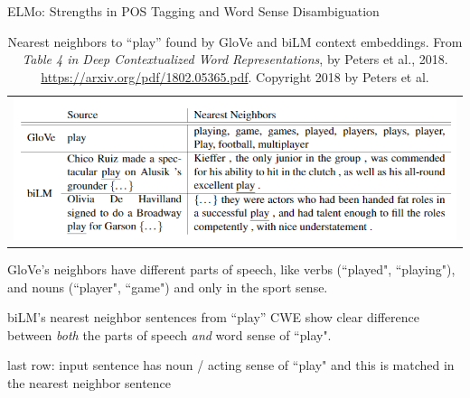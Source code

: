 \begin{frame}{ELMo: Strengths in POS Tagging and Word Sense Disambiguation}
    
    \vspace{10pt}
    
    \begin{table}[ht!]
      \centering
      \begin{tabular}{ c }
        
        \begin{minipage}{.9\textwidth}
          \includegraphics[width=\linewidth]{imgs/table_elmoPlay.png}
        \end{minipage}
        \vspace{-7pt}
      \end{tabular}
      \caption{\linespread{0.3} \scriptsize Nearest neighbors to ``play” found by GloVe and biLM context embeddings. From \emph{Table 4 in Deep Contextualized Word Representations}, by Peters et al., 2018. \url{https://arxiv.org/pdf/1802.05365.pdf}. Copyright 2018 by Peters et al.}
      \label{tbl:elmoPlayExample}
      \vspace{-10pt}
    \end{table}
    
    
    \vspace{-10pt}
    \begin{itemizeSpaced}{7pt}
    
        \pinkbox GloVe's neighbors have different parts of speech, like verbs (``played", ``playing"), and nouns (``player", ``game") and only in the sport sense.
        
        
        \pinkbox biLM's nearest neighbor sentences from ``play'' CWE show clear difference between \emph{both} the parts of speech \emph{and} word sense of ``play". 
        
        \begin{itemizeSpaced}{0pt}
            \pinkbox last row: input sentence has noun / acting sense of ``play" and this is matched in the nearest neighbor sentence
        \end{itemizeSpaced}        
            
    
    \end{itemizeSpaced} 
    
    
\end{frame}